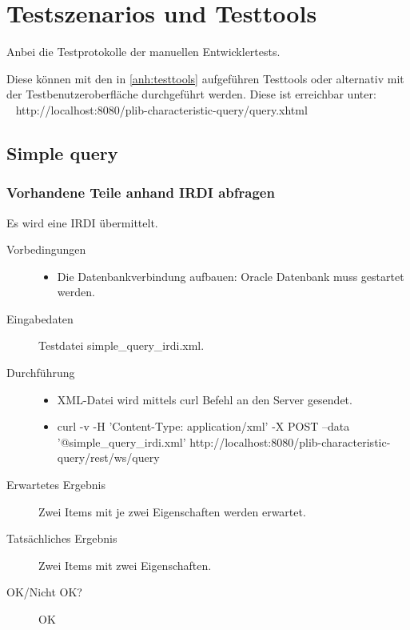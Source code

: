 \chapter{Testszenarios und Testtools} \label{anh:testszenarios}

Anbei die Testprotokolle der manuellen Entwicklertests.

Diese können mit den in \autoref{anh:testtools} aufgeführen Testtools oder alternativ mit der Testbenutzeroberfläche durchgeführt werden. Diese ist erreichbar unter: \\~
http://localhost:8080/plib-characteristic-query/query.xhtml

\section{Simple query}

\subsection{Vorhandene Teile anhand IRDI abfragen}

Es wird eine IRDI übermittelt.

\begin{description}
\item[Vorbedingungen] 
  \begin{itemize}
   \item Die Datenbankverbindung aufbauen: Oracle Datenbank muss gestartet werden.
  \end{itemize}
\item[Eingabedaten] Testdatei simple\_query\_irdi.xml. 
\item[Durchführung]
   \begin{itemize}
   \item XML-Datei wird mittels curl Befehl an den Server gesendet.
   \item curl -v -H 'Content-Type: application/xml' -X POST --data '@simple\_query\-\_irdi.xml' http://localhost:8080/plib-characteristic-query/rest/ws/query
  \end{itemize}
\item[Erwartetes Ergebnis] Zwei Items mit je zwei Eigenschaften werden erwartet. 
\item[Tatsächliches Ergebnis] Zwei Items mit zwei Eigenschaften.
\item[OK/Nicht OK?] OK
\end{description}



